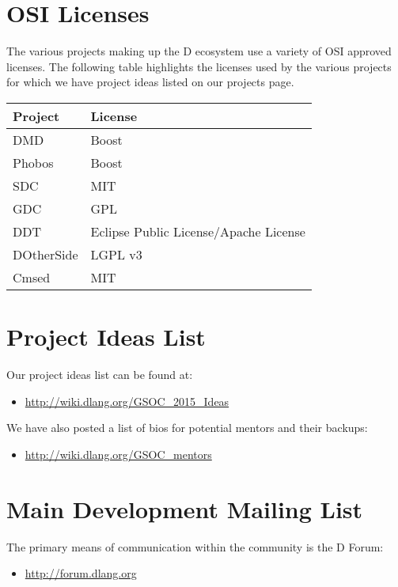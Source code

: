 \documentclass[	DIV=calc,paper=a4,fontsize=11pt,twocolumn]{scrartcl}	%
\begin{document}
\section{OSI Licenses}

The various projects making up the D ecosystem use a variety of OSI approved
licenses.  The following table highlights the licenses used by the various projects
for which we have project ideas listed on our projects page.

\begin{center}
   \begin{tabular}{ | l | l | }
     \hline
     \textbf{Project} & \textbf{License} \\ \hline
     DMD & Boost \\
     Phobos & Boost \\
     SDC & MIT \\
     GDC & GPL \\
     DDT & Eclipse Public License/Apache License  \\
     DOtherSide & LGPL v3 \\
     Cmsed & MIT \\ \hline
   \end{tabular}
\end{center}


\section{Project Ideas List}

Our project ideas list can be found at:
\begin{itemize}
\item \url{http://wiki.dlang.org/GSOC_2015_Ideas}
\end{itemize}

\noindent We have also posted a list of bios for potential mentors and their
backups:
\begin{itemize}
\item \url{http://wiki.dlang.org/GSOC_mentors}
\end{itemize}

\section{Main Development Mailing List}
The primary means of communication within the community is
the D Forum:
\begin{itemize}
\item \url{http://forum.dlang.org}
\end{itemize}
\end{document}
